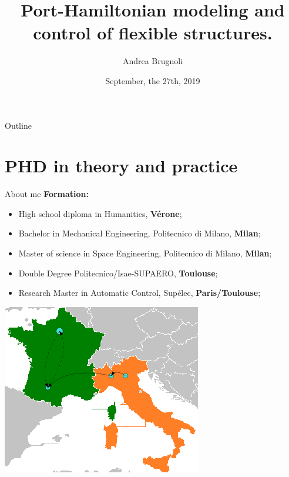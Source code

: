 \documentclass[aspectratio=169]{ISAE-Beamer}
\title[SXS Presentation]{Port-Hamiltonian modeling and control of  flexible structures.}
\institute[ISAE]
{\inst{1}ISAE-SUPAERO, Toulouse}
\author[Andrea Brugnoli]{Andrea Brugnoli\inst{1}}
\date[Pres SXS, 27/09/19]{September, the 27th, 2019}
\begin{document}
\maketitle

\begin{frame}{Outline}

\tableofcontents

\end{frame}

\section{PHD in theory and practice}

\begin{frame}{About me}
\textbf{Formation:}
\begin{itemize}
	\item High school diploma in Humanities, \textbf{Vérone};
	\item Bachelor in Mechanical Engineering, Politecnico di Milano, \textbf{Milan};
	\item Master of science in Space Engineering, Politecnico di Milano, \textbf{Milan};
	\item Double Degree Politecnico/Isae-SUPAERO, \textbf{Toulouse};
	\item Research Master in Automatic Control, Supélec, \textbf{Paris/Toulouse};
\end{itemize}
\centering
\includegraphics[height=0.4\textheight]{trip.png}
\end{frame}
\end{document}
